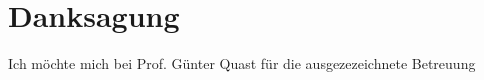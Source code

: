 \chapter{Danksagung} %

Ich möchte mich bei Prof. Günter Quast für die ausgezezeichnete Betreuung 

\cleardoublepage %
